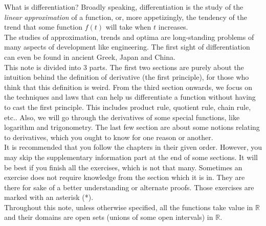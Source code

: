 What is differentiation?
Broadly speaking, differentiation is the study of the \textit{linear approximation} of a function, or, more appetizingly, the tendency of the trend that some function $f(t)$ will take when $t$ increases.\\
The studies of approximation, trends and optima are long-standing problems of many aspects of development like engineering.
The first sight of differentiation can even be found in ancient Greek, Japan and China.\\
This note is divided into 3 parts.
The first two sections are purely about the intuition behind the definition of derivative (the first principle), for those who think that this definition is weird.
From the third section onwards, we focus on the techniques and laws that can help us differentiate a function without having to cast the first principle.
This includes product rule, quotient rule, chain rule, etc..
Also, we will go through the derivatives of some special functions, like logarithm and trigonometry.
The last few section are about some notions relating to derivatives, which you ought to know for one reason or another.\\
It is recommended that you follow the chapters in their given order.
\ifcompilesupp
However, you may skip the supplementary information part at the end of some sections.
\fi
It will be best if you finish all the exercises, which is not that many.
Sometimes an exercise does not require knowledge from the section which it is in.
They are there for sake of a better understanding or alternate proofs.
Those exercises are marked with an asterisk (*).
\\
Throughout this note, unless otherwise specified, all the functions take value in $\mathbb R$ and their domains are open sets (unions of some open intervals) in $\mathbb R$.